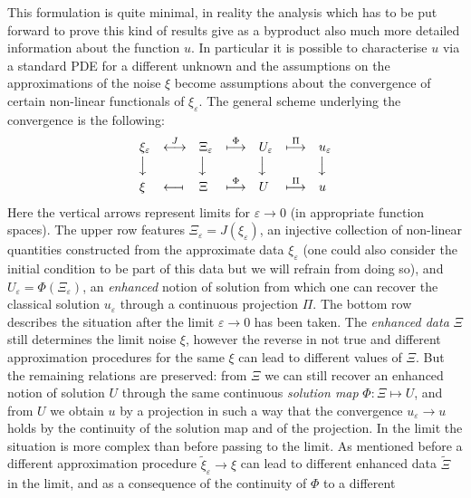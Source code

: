 \documentclass[a4paper, 11pt]{article}
\newcommand{\longdownarrow}{{\mbox{\rotatebox[origin=c]{-90}{$\longrightarrow$}}}}
\newcommand{\tmtextit}[1]{{\itshape{#1}}}
\begin{document}
This formulation is quite minimal, in reality the analysis which has to be put
forward to prove this kind of results give as a byproduct also much more
detailed information about the function $u$. In particular it is possible to
characterise $u$ via a standard PDE for a different unknown and the
assumptions on the approximations of the noise $\xi$ become assumptions about
the convergence of certain non-linear functionals of $\xi_{\varepsilon}$. The
general scheme underlying the convergence is the following:
\[ \begin{array}{lllllll}
     \xi_{\varepsilon} & \overset{J}{\longleftrightarrow} & \Xi_{\varepsilon}
     & \overset{\Phi}{\longmapsto} & U_{\varepsilon} & \overset{\Pi}{\longmapsto} &
     u_{\varepsilon}\\
     \longdownarrow &  & \longdownarrow &  & \longdownarrow &  &
     \longdownarrow\\
     \xi & \longmapsfrom & \Xi & \overset{\Phi}{\longmapsto} & U & \overset{\Pi}{\longmapsto}
     & u
   \end{array} \]
Here the vertical arrows represent limits for $\varepsilon \rightarrow 0$ (in
appropriate function spaces). The upper row features $\Xi_{\varepsilon} = J
(\xi_{\varepsilon})$, an injective collection of non-linear quantities
constructed from the approximate data $\xi_{\varepsilon}$ (one could also
consider the initial condition to be part of this data but we will refrain
from doing so), and $U_{\varepsilon} = \Phi (\Xi_{\varepsilon})$, an
\tmtextit{enhanced} notion of solution from which one can recover the
classical solution $u_{\varepsilon}$ through a continuous projection $\Pi$. The
bottom row describes the situation after the limit $\varepsilon \rightarrow 0$
has been taken. The \tmtextit{enhanced data} $\Xi$ still determines the limit
noise $\xi$, however the reverse in not true and different approximation
procedures for the same $\xi$ can lead to different values of $\Xi$. But the
remaining relations are preserved: from $\Xi$ we can still recover an enhanced
notion of solution $U$ through the same continuous \tmtextit{solution map}
$\Phi : \Xi \mapsto U$, and from $U$ we obtain $u$ by a projection in such a
way that the convergence $u_{\varepsilon} \rightarrow u$ holds by the
continuity of the solution map and of the projection. In the limit the
situation is more complex than before passing to the limit. As mentioned
before a different approximation procedure $\tilde{\xi}_{\varepsilon}
\rightarrow \xi$ can lead to different enhanced data $\tilde{\Xi}$ in the
limit, and as a consequence of the continuity of $\Phi$ to a different
\end{document}
